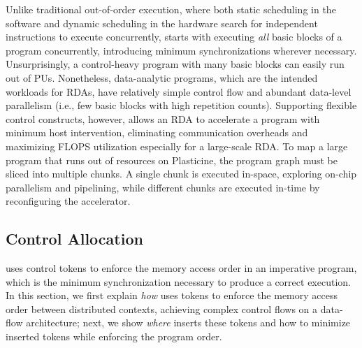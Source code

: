 Unlike traditional out-of-order execution, where both static scheduling in the software and dynamic
scheduling in the hardware search for independent instructions to execute concurrently, 
\name starts with executing \emph{all} basic blocks of a program concurrently,
introducing minimum synchronizations wherever necessary.
Unsurprisingly, a control-heavy program with many basic blocks can easily run out of PUs.
Nonetheless, data-analytic programs, which are the intended workloads for RDAs, have relatively
simple control flow and abundant data-level parallelism (i.e., few basic blocks with high repetition
counts).
Supporting flexible control constructs, however, allows an RDA to accelerate a program with
minimum host intervention, eliminating communication overheads and maximizing FLOPS utilization especially for a
large-scale RDA.
To map a large program that runs out of resources on Plasticine, the program graph must be sliced into multiple chunks.
A single chunk is executed in-space, exploring on-chip parallelism and pipelining,
while different chunks are executed in-time by reconfiguring the accelerator.

\subsection{Control Allocation} \label{sec:controlalloc}
\label{sec:sync}
\name uses control tokens to enforce the memory access order in an imperative program, 
which is the minimum synchronization necessary to produce a correct execution.
In this section, we first explain \emph{how} \name uses tokens to enforce the memory access 
order between distributed contexts, achieving complex control flows on a data-flow architecture;
next, we show \emph{where} \name inserts these tokens and how to minimize inserted tokens while
enforcing the program order.


